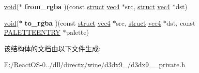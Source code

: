\begin{DoxyCompactItemize}
\hyperlink{interfacevoid}{void}($\ast$ {\bfseries from\+\_\+rgba} )(const \hyperlink{interfacestruct}{struct} \hyperlink{structvec4}{vec4} $\ast$src, \hyperlink{interfacestruct}{struct} \hyperlink{structvec4}{vec4} $\ast$dst)
\item 
\mbox{\label{structpixel__format__desc_a990b35a07988a8d53ebf7a6398ffb804}} 
\hyperlink{interfacevoid}{void}($\ast$ {\bfseries to\+\_\+rgba} )(const \hyperlink{interfacestruct}{struct} \hyperlink{structvec4}{vec4} $\ast$src, \hyperlink{interfacestruct}{struct} \hyperlink{structvec4}{vec4} $\ast$dst, const \hyperlink{structtag_p_a_l_e_t_t_e_e_n_t_r_y}{P\+A\+L\+E\+T\+T\+E\+E\+N\+T\+RY} $\ast$palette)
\end{DoxyCompactItemize}


该结构体的文档由以下文件生成\+:\begin{DoxyCompactItemize}
\item 
E\+:/\+React\+O\+S-\/0../dll/directx/wine/d3dx9\+\_/d3dx9\+\_\+\_\+private.\+h\end{DoxyCompactItemize}
